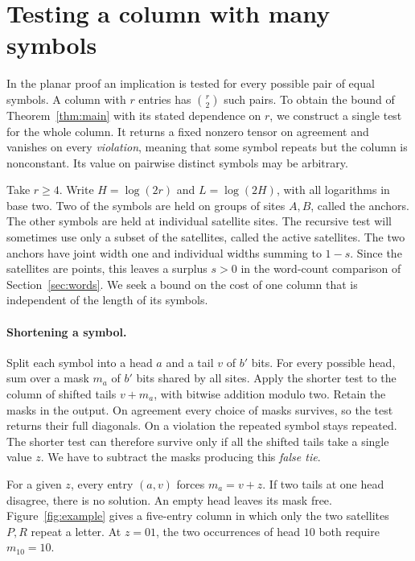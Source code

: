 \section{Testing a column with many symbols}\label{sec:design}

In the planar proof an implication is tested for every possible pair
of equal symbols. A column with \(r\) entries has \(\binom r2\) such
pairs. To obtain the bound of Theorem~\ref{thm:main} with its stated
dependence on \(r\), we construct a single test for the whole column.
It returns a fixed nonzero tensor on agreement and vanishes on every
\emph{violation}, meaning that some symbol repeats but the column is
nonconstant. Its value on pairwise distinct symbols may be arbitrary.

Take \(r\ge4\). Write \(H=\log(2r)\) and \(L=\log(2H)\), with all
logarithms in base two. Two of the symbols are held on groups of sites
\(A,B\), called the anchors. The other symbols are held at individual
satellite sites. The recursive test will sometimes use only a subset
of the satellites, called the active satellites. The two anchors have
joint width one and individual widths summing to \(1-s\). Since the
satellites are points, this leaves a surplus \(s>0\) in the word-count
comparison of Section~\ref{sec:words}. We seek a bound on the cost of
one column that is independent of the length of its symbols.

\paragraph{Shortening a symbol.}
Split each symbol into a head \(a\) and a tail \(v\) of \(b'\) bits.
For every possible head, sum over a mask \(m_a\) of \(b'\) bits shared
by all sites. Apply the shorter test to the column of shifted tails
\(v+m_a\), with bitwise addition modulo two. Retain the masks in the
output. On agreement every choice of masks survives, so the test
returns their full diagonals. On a violation the repeated symbol stays
repeated. The shorter test can therefore survive only if all the
shifted tails take a single value \(z\). We have to subtract the masks
producing this \emph{false tie}.

For a given \(z\), every entry \((a,v)\) forces \(m_a=v+z\). If two
tails at one head disagree, there is no solution. An empty head
leaves its mask free. Figure~\ref{fig:example} gives a five-entry
column in which only the two satellites \(P,R\) repeat a letter.
At \(z=01\), the two occurrences of head \(10\) both require
\(m_{10}=10\).

